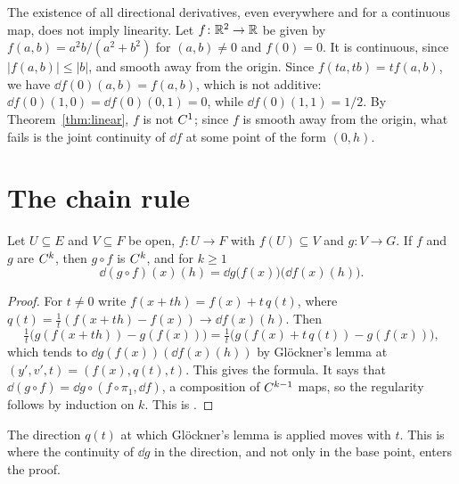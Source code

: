 \begin{example}
  \label{ex:not-linear}
  The existence of all directional derivatives, even everywhere and for a continuous map, does
  not imply linearity. Let $f \colon \mathbb{R}^2 \to \mathbb{R}$ be given by $f(a, b) = a^2 b/(a^2 + b^2)$ for
  $(a,b) \neq 0$ and $f(0) = 0$. It is continuous, since $|f(a,b)| \leq |b|$, and smooth away
  from the origin. Since $f(t a, t b) = t f(a, b)$, we have $\dd f(0)(a, b) = f(a, b)$, which
  is not additive: $\dd f(0)(1,0) = \dd f(0)(0,1) = 0$, while $\dd f(0)(1,1) = 1/2$. By
  Theorem~\ref{thm:linear}, $f$ is not $C^{1}$; since $f$ is smooth away from the origin,
  what fails is the joint continuity of $\dd f$ at some point of the form $(0, h)$.
\end{example}

\section{The chain rule}

\begin{theorem}
  \label{thm:chain-rule}
  \leanok
  Let $U \subseteq E$ and $V \subseteq F$ be open, $f \colon U \to F$ with $f(U) \subseteq V$
  and $g \colon V \to G$. If $f$ and $g$ are $C^{k}$, then $g \circ f$ is $C^{k}$, and for
  $k \geq 1$
  \[
    \dd (g \circ f)(x)(h) = \dd g\bigl(f(x)\bigr)\bigl(\dd f(x)(h)\bigr) .
  \]
\end{theorem}

\begin{proof}
  \leanok
  For $t \neq 0$ write $f(x + th) = f(x) + t\, q(t)$, where
  $q(t) = \frac{1}{t}(f(x + th) - f(x)) \to \dd f(x)(h)$. Then
  \[
    \tfrac{1}{t}\bigl(g(f(x + th)) - g(f(x))\bigr)
    = \tfrac{1}{t}\bigl(g(f(x) + t\, q(t)) - g(f(x))\bigr),
  \]
  which tends to $\dd g(f(x))(\dd f(x)(h))$ by Glöckner's lemma at
  $(y', v', t) = (f(x), q(t), t)$. This gives the formula. It says that
  $\dd (g \circ f) = \dd g \circ (f \circ \pi_1, \dd f)$, a composition of $C^{k-1}$ maps, so
  the regularity follows by induction on $k$. This is \cite[1.2.13 and 1.3.4]{GN26}.
\end{proof}

\begin{remark}
  The direction $q(t)$ at which Glöckner's lemma is applied moves with $t$. This is where the
  continuity of $\dd g$ in the direction, and not only in the base point, enters the proof.
\end{remark}

